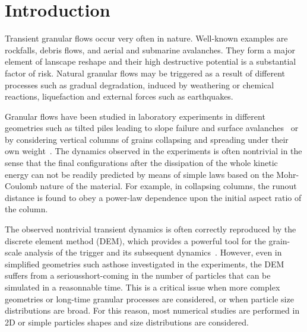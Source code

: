 \documentclass[3p,times,procedia,number]{elsarticle}
\begin{document}



\section{Introduction}
\label{sec:intro}
Transient granular flows occur very often in nature. Well-known examples are
rockfalls, debris flows, and aerial and submarine avalanches. They form a major
element of lanscape reshape and their high destructive potential is a
substantial factor of risk. Natural granular flows may be triggered as a result
of different processes such as gradual degradation, induced by weathering or
chemical reactions, liquefaction and external forces such as earthquakes.          

Granular flows have been studied in laboratory experiments in different 
geometries such as tilted piles leading to slope failure and surface
avalanches~\citep{Legros2002, Iverson1997} or by considering vertical columns 
of grains collapsing and spreading under their own
weight~\citep{Lajeunesse2004, Lajeunesse2005}. The dynamics observed in the
experiments is often nontrivial in the sense that the final configurations
after the dissipation of the whole kinetic energy can not be readily predicted
by means of simple laws based on the Mohr-Coulomb nature of the material. For
example, in collapsing columns, the runout distance is found to obey a
power-law dependence upon the initial aspect ratio of the column. 

The observed nontrivial transient dynamics is often correctly reproduced by the
discrete element method (DEM), which provides a powerful tool for the
grain-scale analysis of the trigger and its subsequent
dynamics~\citep{Staron2005, Staron2009}. However, even in simplified geometries
such asthose investigated in the experiments, the DEM suffers from a
seriousshort-coming in the number of particles that can be simulated in a
reasonnable time. This is a critical issue when more complex geometries or
long-time granular processes are considered, or when particle size
distributions are broad. For this reason, most numerical studies are performed
in 2D or simple particles shapes and size distributions are considered. 
\end{document}
